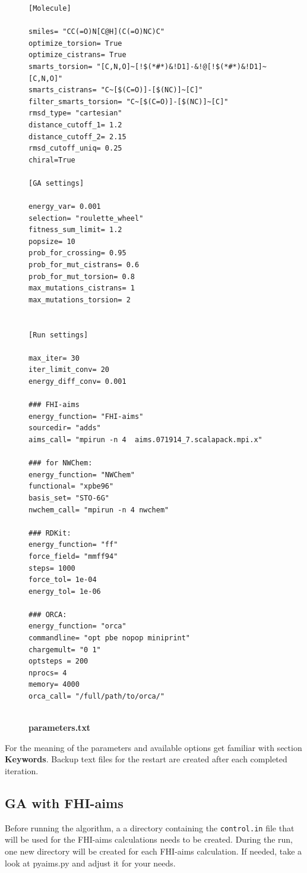 \documentclass[a4paper]{article}
\begin{document}
\begin{figure}
  \footnotesize
  \begin{verbatim}  
[Molecule]

smiles= "CC(=O)N[C@H](C(=O)NC)C"
optimize_torsion= True
optimize_cistrans= True
smarts_torsion= "[C,N,O]~[!$(*#*)&!D1]-&!@[!$(*#*)&!D1]~[C,N,O]"
smarts_cistrans= "C~[$(C=O)]-[$(NC)]~[C]"
filter_smarts_torsion= "C~[$(C=O)]-[$(NC)]~[C]"
rmsd_type= "cartesian"
distance_cutoff_1= 1.2
distance_cutoff_2= 2.15
rmsd_cutoff_uniq= 0.25
chiral=True

[GA settings]

energy_var= 0.001
selection= "roulette_wheel"
fitness_sum_limit= 1.2
popsize= 10
prob_for_crossing= 0.95
prob_for_mut_cistrans= 0.6
prob_for_mut_torsion= 0.8
max_mutations_cistrans= 1
max_mutations_torsion= 2


[Run settings]

max_iter= 30
iter_limit_conv= 20
energy_diff_conv= 0.001 

### FHI-aims
energy_function= "FHI-aims"
sourcedir= "adds"
aims_call= "mpirun -n 4  aims.071914_7.scalapack.mpi.x"

### for NWChem:
energy_function= "NWChem"
functional= "xpbe96" 
basis_set= "STO-6G"
nwchem_call= "mpirun -n 4 nwchem"

### RDKit:
energy_function= "ff"
force_field= "mmff94"
steps= 1000
force_tol= 1e-04
energy_tol= 1e-06

### ORCA:
energy_function= "orca"
commandline= "opt pbe nopop miniprint"
chargemult= "0 1"
optsteps = 200
nprocs= 4
memory= 4000
orca_call= "/full/path/to/orca/"


  \end{verbatim}
  \normalsize
  \vspace*{-4.0ex}
\caption{\label{Fig:parameters}
	  \textbf{\large{parameters.txt}}
 }
\end{figure}


\noindent
For the meaning of the parameters and available options get familiar with section \textbf{Keywords}.
\noindent
Backup text files for the restart are created after each completed iteration. 



\subsection{GA with FHI-aims}
Before running the algorithm, a a directory containing the \texttt{control.in} file that will be used for the FHI-aims calculations needs to be created. During the run, one new directory will be created for each FHI-aims calculation. If needed, take a look at pyaims.py and adjust it for your needs.
\end{document}
